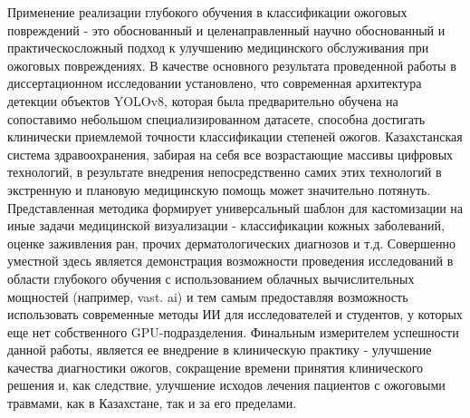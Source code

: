 Применение реализации глубокого обучения в классификации ожоговых повреждений - это обоснованный и целенаправленный научно обоснованный и практическосложный подход к улучшению медицинского обслуживания при ожоговых повреждениях. В качестве основного результата проведенной работы в диссертационном исследовании установлено, что современная архитектура детекции объектов YOLOv8, которая была предварительно обучена на сопоставимо небольшом специализированном датасете, способна достигать клинически приемлемой точности классификации степеней ожогов. Казахстанская система здравоохранения, забирая на себя все возрастающие массивы цифровых технологий, в результате внедрения непосредственно самих этих технологий в экстренную и плановую медицинскую помощь может значительно потянуть. Представленная методика формирует универсальный шаблон для кастомизации на иные задачи медицинской визуализации - классификации кожных заболеваний, оценке заживления ран, прочих дерматологических диагнозов и т.д. Совершенно уместной здесь является демонстрация возможности проведения исследований в области глубокого обучения с использованием облачных вычислительных мощностей (например, vast. ai) и тем самым предоставляя возможность использовать современные методы ИИ для исследователей и студентов, у которых еще нет собственного GPU-подразделения. Финальным измерителем успешности данной работы, является ее внедрение в клиническую практику - улучшение качества диагностики ожогов, сокращение времени принятия клинического решения и, как следствие, улучшение исходов лечения пациентов с ожоговыми травмами, как в Казахстане, так и за его пределами.
